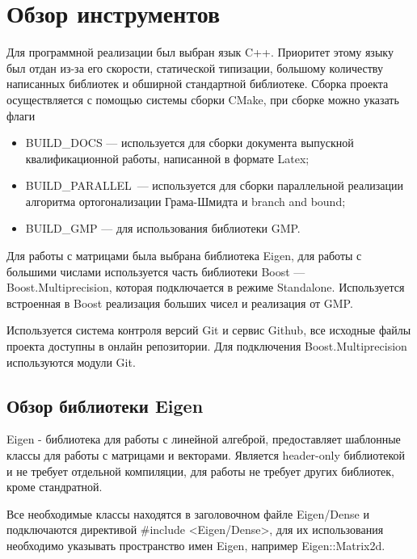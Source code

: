 \newpage

\section{Обзор инструментов}

Для программной реализации был выбран язык C++. Приоритет этому языку был отдан из-за его скорости, статической типизации, большому количеству написанных библиотек и обширной стандартной библиотеке. Сборка проекта осуществляется с помощью системы сборки CMake, при сборке можно указать флаги 
\begin{itemize}

\item BUILD\_DOCS --- используется для сборки документа выпускной квалификационной работы, написанной в формате Latex;

\item BUILD\_PARALLEL\ ---  используется для сборки параллельной реализации алгоритма ортогонализации Грама-Шмидта и branch and bound;

\item BUILD\_GMP --- для использования библиотеки GMP.

\end{itemize} 

Для работы с матрицами была выбрана библиотека Eigen, для работы с большими числами используется часть библиотеки Boost --- Boost.Multiprecision, которая подключается в режиме Standalone. Используется встроенная в Boost реализация больших чисел и реализация от GMP.

Используется система контроля версий Git и сервис Github, все исходные файлы проекта доступны в онлайн репозитории. Для подключения Boost.Multiprecision используются модули Git.

\subsection{Обзор библиотеки Eigen}

Eigen - библиотека для работы с линейной алгеброй, предоставляет шаблонные классы для работы с матрицами и векторами. Является header-only библиотекой и не требует отдельной компиляции, для работы не требует других библиотек, кроме стандратной.

Все необходимые классы находятся в заголовочном файле Eigen/Dense и подключаются директивой \#include <Eigen/Dense>, для их использования необходимо указывать пространство имен Eigen, например Eigen::Matrix2d\cite{EigenDoc}.

